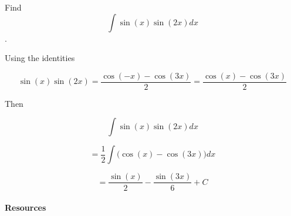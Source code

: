 Find$$\int\sin(x)\sin(2x)dx$$ .



Using the identities



$$\sin(x)\sin(2x)=\frac{\cos(-x)-\cos(3x)}{2}=\frac{\cos(x)-\cos(3x)}{2}$$

Then



$$\int\sin(x)\sin(2x)dx$$

$$=\frac{1}{2}\int\Big(\cos(x)-\cos(3x)\Big)dx$$

$$=\frac{\sin(x)}{2}-\frac{\sin(3x)}{6}+C$$



\paragraph{Resources}



